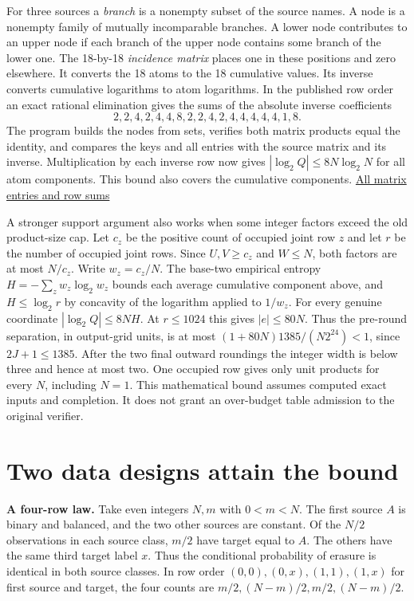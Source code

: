 For three sources a \emph{branch} is a nonempty subset of the source names. A node is a nonempty family of mutually incomparable branches. A lower node contributes to an upper node if each branch of the upper node contains some branch of the lower one. The 18-by-18 \emph{incidence matrix} places one in these positions and zero elsewhere. It converts the 18 atoms to the 18 cumulative values. Its inverse converts cumulative logarithms to atom logarithms. In the published row order an exact rational elimination gives the sums of the absolute inverse coefficients \[
2,2,4,2,4,4,8,2,2,4,2,4,4,4,4,4,1,8.
\] The program builds the nodes from sets, verifies both matrix products equal the identity, and compares the keys and all entries with the source matrix and its inverse. Multiplication by each inverse row now gives \(|\log_2 Q|\le8N\log_2 N\) for all atom components. This bound also covers the cumulative components. \href{https://github.com/sepahead/pid-rs/blob/main/audit/research/signed-log-certificate-enclosure/numerical/order.json}{All matrix entries and row sums}

A stronger support argument also works when some integer factors exceed the old product-size cap. Let \(c_z\) be the positive count of occupied joint row \(z\) and let \(r\) be the number of occupied joint rows. Since \(U,V\ge c_z\) and \(W\le N\), both factors are at most \(N/c_z\). Write \(w_z=c_z/N\). The base-two empirical entropy \(H=-\sum_z w_z\log_2 w_z\) bounds each average cumulative component above, and \(H\le\log_2 r\) by concavity of the logarithm applied to \(1/w_z\). For every genuine coordinate \(|\log_2 Q|\le8NH\). At \(r\le1024\) this gives \(|e|\le80N\). Thus the pre-round separation, in output-grid units, is at most \((1+80N)1385/(N2^{24})<1\), since \(2J+1\le1385\). After the two final outward roundings the integer width is below three and hence at most two. One occupied row gives only unit products for every \(N\), including \(N=1\). This mathematical bound assumes computed exact inputs and completion. It does not grant an over-budget table admission to the original verifier.

\clearpage

\section{Two data designs attain the bound}\label{two-data-designs-attain-the-bound}

\textbf{A four-row law.} Take even integers \(N,m\) with \(0<m<N\). The first source \(A\) is binary and balanced, and the two other sources are constant. Of the \(N/2\) observations in each source class, \(m/2\) have target equal to \(A\). The others have the same third target label \(x\). Thus the conditional probability of erasure is identical in both source classes. In row order \((0,0),(0,x),(1,1),(1,x)\) for first source and target, the four counts are \(m/2,(N-m)/2,m/2,(N-m)/2\).

